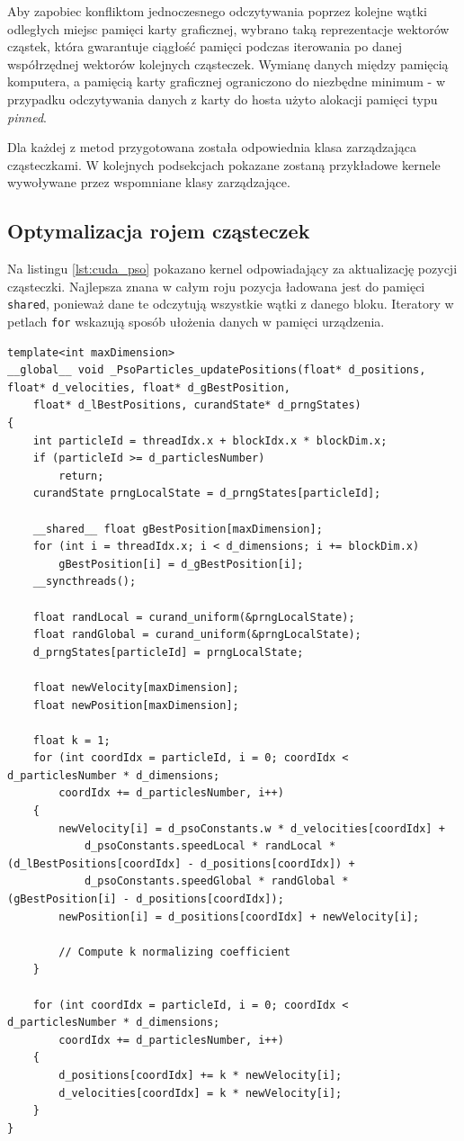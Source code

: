 \documentclass[11pt, a4paper, oneside]{article}
\begin{document}
Aby zapobiec konfliktom jednoczesnego odczytywania poprzez kolejne wątki odległych miejsc pamięci karty graficznej, wybrano taką reprezentacje wektorów cząstek, która gwarantuje ciągłość pamięci podczas iterowania po danej współrzędnej wektorów kolejnych cząsteczek. Wymianę danych między pamięcią komputera, a pamięcią karty graficznej ograniczono do niezbędne minimum - w przypadku odczytywania danych z karty do hosta użyto alokacji pamięci typu \textit{pinned}.

Dla każdej z metod przygotowana została odpowiednia klasa zarządzająca cząsteczkami. W kolejnych podsekcjach pokazane zostaną przykładowe kernele wywoływane przez wspomniane  klasy zarządzające.

\subsection{Optymalizacja rojem cząsteczek}
Na listingu \ref{lst:cuda_pso} pokazano kernel odpowiadający za aktualizację pozycji cząsteczki. Najlepsza znana w całym roju pozycja ładowana jest do pamięci \lstinline[style=mycpp]{shared}, ponieważ dane te odczytują wszystkie wątki z danego bloku. Iteratory w petlach \lstinline[style=mycpp]{for} wskazują sposób ułożenia danych w pamięci urządzenia.

\begin{lstlisting}[style=mycpp, label=lst:cuda_pso, caption={Kernel CUDA aktualizujący cząsteczkę PSO.}]
template<int maxDimension>
__global__ void _PsoParticles_updatePositions(float* d_positions, float* d_velocities, float* d_gBestPosition,
	float* d_lBestPositions, curandState* d_prngStates)
{
	int particleId = threadIdx.x + blockIdx.x * blockDim.x;
	if (particleId >= d_particlesNumber)
		return;
	curandState prngLocalState = d_prngStates[particleId];

	__shared__ float gBestPosition[maxDimension];
	for (int i = threadIdx.x; i < d_dimensions; i += blockDim.x)
		gBestPosition[i] = d_gBestPosition[i];
	__syncthreads();

	float randLocal = curand_uniform(&prngLocalState);
	float randGlobal = curand_uniform(&prngLocalState);
	d_prngStates[particleId] = prngLocalState;

	float newVelocity[maxDimension];
	float newPosition[maxDimension];

	float k = 1;
	for (int coordIdx = particleId, i = 0; coordIdx < d_particlesNumber * d_dimensions;
		coordIdx += d_particlesNumber, i++)
	{
		newVelocity[i] = d_psoConstants.w * d_velocities[coordIdx] +
			d_psoConstants.speedLocal * randLocal * (d_lBestPositions[coordIdx] - d_positions[coordIdx]) +
			d_psoConstants.speedGlobal * randGlobal * (gBestPosition[i] - d_positions[coordIdx]);
		newPosition[i] = d_positions[coordIdx] + newVelocity[i];

		// Compute k normalizing coefficient
	}

	for (int coordIdx = particleId, i = 0; coordIdx < d_particlesNumber * d_dimensions;
		coordIdx += d_particlesNumber, i++)
	{
		d_positions[coordIdx] += k * newVelocity[i];
		d_velocities[coordIdx] = k * newVelocity[i];
	}
}
\end{lstlisting}
\end{document}
